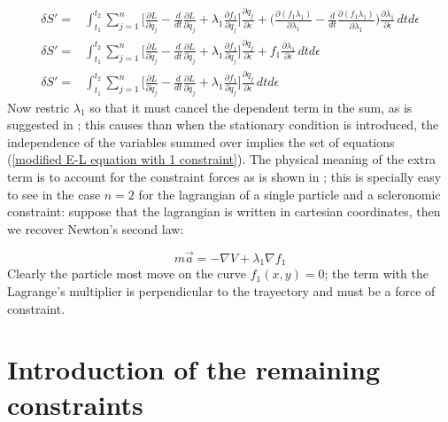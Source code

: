 \documentclass{article}
\begin{document}
\begin{equation*} \label{first variation of the modified lagrangian with 1 constraint}
\begin{split}
	\delta S' =& \int_{t_1}^{t_2} \sum_{j=1}^{n} \bigg[ \frac{\partial L}{\partial {q_j}} -\frac{d}{dt}\frac{\partial L}{\partial \dot{q_j}} +\lambda_1 \frac{\partial f_1}{\partial q_j} \bigg]\frac{\partial q_j}{\partial \epsilon} + \bigg(\frac{\partial (f_1 \lambda_1)}{\partial \lambda_1} -\frac{d}{dt}\frac{\partial (f_1 \lambda_1)}{\partial \dot{\lambda}_1} \bigg)\frac{\partial \lambda_1}{\partial \epsilon}  \, dtd\epsilon\\
\delta S' =& \int_{t_1}^{t_2} \sum_{j=1}^{n} \bigg[ \frac{\partial L}{\partial {q_j}} -\frac{d}{dt}\frac{\partial L}{\partial \dot{q_j}} +\lambda_1 \frac{\partial f_1}{\partial q_j} \bigg]\frac{\partial q_j}{\partial \epsilon} + f_1 \frac{\partial \lambda_1}{\partial \epsilon} \, dtd\epsilon \\
\delta S' =& \int_{t_1}^{t_2} \sum_{j=1}^{n} \bigg[ \frac{\partial L}{\partial {q_j}} -\frac{d}{dt}\frac{\partial L}{\partial \dot{q_j}} +\lambda_1 \frac{\partial f_1}{\partial q_j} \bigg]\frac{\partial q_j}{\partial \epsilon} \, dtd\epsilon 
\end{split}
\end{equation*}
\justify
Now restric $\lambda_1$ so that it must cancel the dependent term in the sum, as is suggested in \cite{goldstein2002classical}; this causes than when the stationary condition is introduced, the independence of the variables summed over implies the set of equations (\ref{modified E-L equation with 1 constraint}). The physical meaning of the extra term is to account for the constraint forces as is shown in \cite{goldstein2002classical}; this is specially easy to see in the case $n=2$ for the lagrangian of a single particle and a scleronomic constraint: suppose that the lagrangian is written in cartesian coordinates, then we recover Newton's second law:

\begin{equation}
m\vec{a} = -\nabla V + \lambda_1 \nabla f_1  
\end{equation}
\justify
Clearly the particle most move on the curve $f_1(x,y)=0$; the term with the Lagrange's multiplier is perpendicular to the trayectory and must be a force of constraint.

\section{Introduction of the remaining constraints} 

{}

\end{document}
